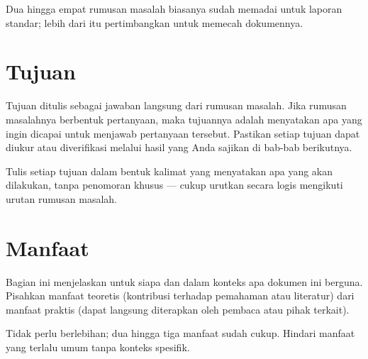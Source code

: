 Dua hingga empat rumusan masalah biasanya sudah memadai untuk laporan standar; lebih dari itu pertimbangkan untuk memecah dokumennya.

\section{Tujuan}
Tujuan ditulis sebagai jawaban langsung dari rumusan masalah. Jika rumusan masalahnya berbentuk pertanyaan, maka tujuannya adalah menyatakan apa yang ingin dicapai untuk menjawab pertanyaan tersebut. Pastikan setiap tujuan dapat diukur atau diverifikasi melalui hasil yang Anda sajikan di bab-bab berikutnya.

Tulis setiap tujuan dalam bentuk kalimat yang menyatakan apa yang akan dilakukan, tanpa penomoran khusus — cukup urutkan secara logis mengikuti urutan rumusan masalah.

\section{Manfaat}
Bagian ini menjelaskan untuk siapa dan dalam konteks apa dokumen ini berguna. Pisahkan manfaat teoretis (kontribusi terhadap pemahaman atau literatur) dari manfaat praktis (dapat langsung diterapkan oleh pembaca atau pihak terkait).

Tidak perlu berlebihan; dua hingga tiga manfaat sudah cukup. Hindari manfaat yang terlalu umum tanpa konteks spesifik.
